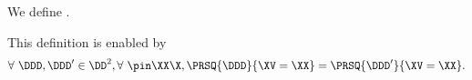 \begin{definition}
  We define \probdef.%
\end{definition}

\begin{justification}
  This definition is enabled by 
  $$\forall\ \DDD, \DDD' \in \DD^2, \forall\ \pin\XX\X, \PRSQ{\DDD}{\XV = \XX} 
  = 
  \PRSQ{\DDD'}{\XV = \XX}.$$%
\end{justification}
